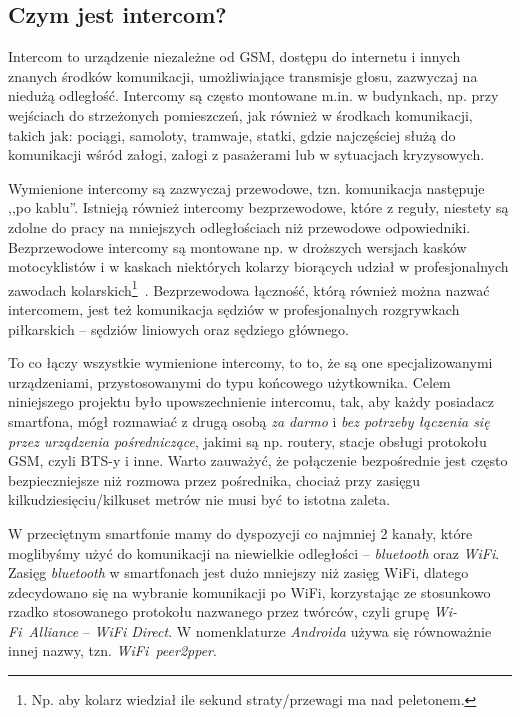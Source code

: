 \documentclass[a4paper,titlepage]{article}
\theoremstyle{break}
\begin{document}
\subsection{Czym jest intercom?}

Intercom to urządzenie niezależne od GSM, dostępu do internetu i innych znanych środków komunikacji, umożliwiające transmisje głosu, zazwyczaj na niedużą odległość. Intercomy są często montowane m.in. w budynkach, np. przy wejściach do strzeżonych pomieszczeń, jak również w środkach komunikacji, takich jak: pociągi, samoloty, tramwaje, statki, gdzie najczęściej służą do komunikacji wśród załogi, załogi z pasażerami lub w sytuacjach kryzysowych.

Wymienione intercomy są zazwyczaj przewodowe, tzn. komunikacja następuje ,,po kablu''. Istnieją również intercomy bezprzewodowe, które z reguły, niestety są zdolne do pracy na mniejszych odległościach niż przewodowe odpowiedniki. Bezprzewodowe intercomy są montowane np. w droższych wersjach kasków motocyklistów i w kaskach niektórych kolarzy biorących udział w profesjonalnych zawodach kolarskich\footnote{Np. aby kolarz wiedział ile sekund straty/przewagi ma nad peletonem.}~\cite{www:bike-intercom,www:bike-intercom-mce}. Bezprzewodowa łączność, którą również można nazwać intercomem, jest też komunikacja sędziów w profesjonalnych rozgrywkach piłkarskich -- sędziów liniowych oraz sędziego głównego.

To co łączy wszystkie wymienione intercomy, to to, że są one specjalizowanymi urządzeniami, przystosowanymi do typu końcowego użytkownika. Celem niniejszego projektu było upowszechnienie intercomu, tak, aby każdy posiadacz smartfona, mógł rozmawiać z drugą osobą \emph{za darmo} i \emph{bez potrzeby łączenia się przez urządzenia pośredniczące}, jakimi są np. routery, stacje obsługi protokołu GSM, czyli BTS-y i inne. Warto zauważyć, że połączenie bezpośrednie jest często bezpieczniejsze niż rozmowa przez pośrednika, chociaż przy zasięgu kilkudziesięciu/kilkuset metrów nie musi być to istotna zaleta.

W przeciętnym smartfonie mamy do dyspozycji co najmniej 2 kanały, które moglibyśmy użyć do komunikacji na niewielkie odległości -- \emph{bluetooth} oraz \emph{WiFi}. Zasięg \emph{bluetooth} w smartfonach jest dużo mniejszy niż zasięg WiFi, dlatego zdecydowano się na wybranie komunikacji po WiFi, korzystając ze stosunkowo rzadko stosowanego protokołu nazwanego przez twórców, czyli grupę \emph{Wi-Fi~Alliance} -- \emph{WiFi Direct}. W nomenklaturze \emph{Androida} używa się równoważnie innej nazwy, tzn. \emph{WiFi~peer2pper}.
\end{document}
